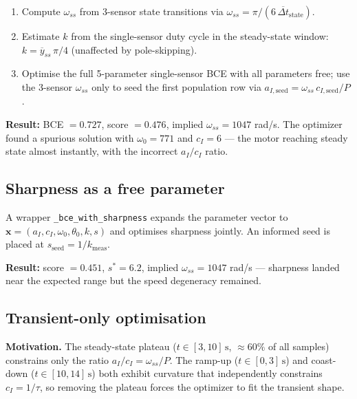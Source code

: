 \documentclass[11pt,a4paper]{article}
\begin{document}
\begin{enumerate}
  \item Compute $\omega_{ss}$ from 3-sensor state transitions via
        $\omega_{ss} = \pi / (6\,\overline{\Delta t}_{\text{state}})$.
  \item Estimate $k$ from the single-sensor duty cycle in the steady-state
        window: $k = \overline{y}_{ss}\,\pi/4$ (unaffected by pole-skipping).
  \item Optimise the full 5-parameter single-sensor BCE with all parameters
        free; use the 3-sensor $\omega_{ss}$ only to seed the first population
        row via $a_{I,\text{seed}} = \omega_{ss}\,c_{I,\text{seed}}/P$.
\end{enumerate}

\textbf{Result:} BCE $=0.727$, score $=0.476$, implied $\omega_{ss}=1047$ rad/s.
The optimizer found a spurious solution with $\omega_0=771$ and $c_I=6$ ---
the motor reaching steady state almost instantly, with the incorrect
$a_I/c_I$ ratio.

\subsection{Sharpness as a free parameter}

A wrapper \texttt{\_bce\_with\_sharpness} expands the parameter vector to
$\mathbf{x} = (a_I,c_I,\omega_0,\theta_0,k,s)$ and optimises sharpness
jointly.  An informed seed is placed at $s_{\text{seed}} = 1/k_{\text{meas}}$.

\textbf{Result:} score $=0.451$, $s^*=6.2$, implied $\omega_{ss}=1047$ rad/s
--- sharpness landed near the expected range but the speed degeneracy
remained.

\subsection{Transient-only optimisation}

\textbf{Motivation.}  The steady-state plateau ($t \in [3,10]\,\text{s}$,
$\approx 60\%$ of all samples) constrains only the ratio $a_I/c_I = \omega_{ss}/P$.
The ramp-up ($t \in [0,3]\,\text{s}$) and coast-down ($t \in [10,14]\,\text{s}$)
both exhibit curvature that independently constrains $c_I = 1/\tau$, so
removing the plateau forces the optimizer to fit the transient shape.
\end{document}
